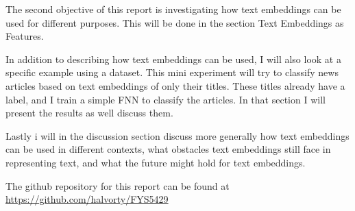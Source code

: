 The second objective of this report is investigating how text embeddings can be used
for different purposes.
This will be done in the section Text Embeddings as Features. 

In addition to describing how text embeddings can be used, I will also 
look at a specific example using a dataset. This mini experiment will
try to classify news articles based on text embeddings of only their titles.
These titles already have a label, and I train a simple FNN to classify the articles.
In that section I will present the results as well discuss them.

Lastly i will in the discussion section discuss more generally 
how text embeddings can be used in different contexts, what obstacles text embeddings
still face in representing text, and what the future might hold for text embeddings.

The github repository for this report can be found at \url{https://github.com/halvorty/FYS5429}

